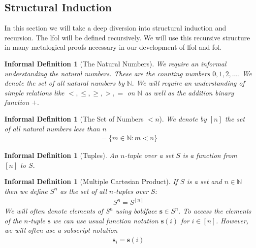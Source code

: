 \documentclass[12pt]{article}
\theoremstyle{break}
\theoremstyle{break}
\theoremstyle{break}
\theoremstyle{break}
\theoremstyle{break}
\newtheorem{informal definition}[definition]{Informal Definition}
\theoremstyle{break}
\newtheorem{informal theorem}[theorem]{Informal Theorem}
\newcommand{\bv}[1]{\boldsymbol{#1}}
\newcommand{\natnum}[0]{\mathbb{N}}
\begin{document}
	\subsection{Structural Induction}
	
	In this section we will take a deep diversion into structural induction and recursion. 
	The \gls{lfol} will be defined recursively.
	We will use this recursive structure in many metalogical proofs necessary in our development of \gls{lfol} and \gls{fol}.
	
	\begin{informal definition}[The Natural Numbers]
		We require an informal understanding the natural numbers.
		These are the counting numbers $0, 1, 2, \ldots$.
		We denote the set of all natural numbers by $\natnum$.
		We will require an understanding of simple relations like $<, \le, \ge, >, =$ on $\natnum$ as well as the addition binary function $+$.
	\end{informal definition}
	
	\begin{informal definition}[The Set of Numbers $< n$]
		We denote by $[n]$ the set of all natural numbers less than $n$
		\begin{align*}
			[n] = \{m\in\natnum: m < n\}
		\end{align*}
	\end{informal definition}
	
	\begin{informal definition}[Tuples]
		An $n$-tuple over a set $S$ is a function from $[n]$ to $S$.
	\end{informal definition}
	
	\begin{informal definition}[Multiple Cartesian Product]
		If $S$ is a set and $n\in \natnum$ then we define $S^n$ as the set of all $n$-tuples over $S$:
		\begin{align*}
			S^n = S^{[n]}
		\end{align*}
		We will often denote elements of $S^n$ using boldface $\bv{s}\in S^n$.
		To access the elements of the $n$-tuple $\bv{s}$ we can use usual function notation $\bv{s}(i)$ for $i\in [n]$. 
		However, we will often use a subscript notation
		\begin{align*}
			\bv{s}_i = \bv{s}(i)
		\end{align*}
	\end{informal definition}
		
\end{document}
